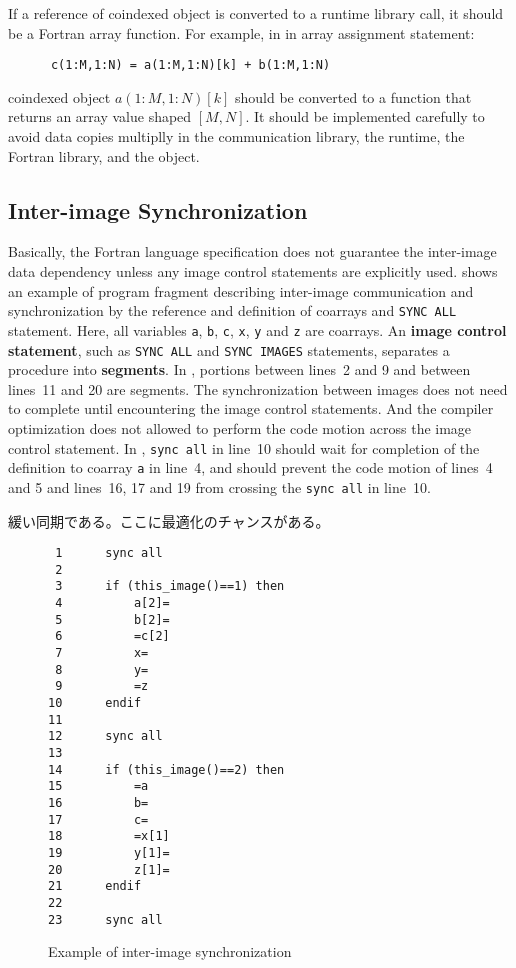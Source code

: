 \requirement
If a reference of coindexed object is converted to a runtime library call,
it should be a Fortran array function. 
For example, in in array assignment statement:
\begin{verbatim}
      c(1:M,1:N) = a(1:M,1:N)[k] + b(1:M,1:N)
\end{verbatim}
coindexed object $a(1:M,1:N)[k]$ should be converted to a function that
returns an array value shaped $[M, N]$.
It should be implemented carefully to avoid data copies multiplly in the
communication library, the runtime, the Fortran library, and the object.


\subsection{Inter-image Synchronization}\label{spec-sync}
Basically, the Fortran language specification does not guarantee the inter-image 
data dependency unless any image control statements are explicitly used.
 shows an example of program fragment describing inter-image communication
and synchronization by the reference and definition of coarrays and {\tt SYNC ALL} statement.
Here, all variables {\tt a}, {\tt b}, {\tt c}, {\tt x}, {\tt y} and {\tt z} are coarrays.
%
An {\bf image control statement}, such as {\tt SYNC ALL} and {\tt SYNC IMAGES} statements, 
separates a procedure into {\bf segments}. In , portions between lines~2 and 9 and 
between lines~11 and 20 are segments.
The synchronization between images does not need to complete until encountering the 
image control statements. And the compiler optimization does not allowed to perform 
the code motion across the image control statement. In , 
{\tt sync all} in line~10 should wait for completion of the definition to coarray {\tt a} 
in line~4, and should prevent the code motion of lines~4 and 5 and lines~16, 17 and 19 
from crossing the {\tt sync all} in line~10.

緩い同期である。ここに最適化のチャンスがある。

\begin{figure}[hbt]
 \begin{center}
\begin{verbatim}
 1      sync all
 2
 3      if (this_image()==1) then
 4          a[2]=
 5          b[2]=
 6          =c[2]
 7          x=
 8          y=
 9          =z
10      endif
11
12      sync all
13
14      if (this_image()==2) then
15          =a
16          b=
17          c=
18          =x[1]
19          y[1]=
20          z[1]=
21      endif
22
23      sync all

\end{verbatim}
  \caption{Example of inter-image synchronization}
  \label{fig:sync-ex}
 \end{center}
\end{figure}



